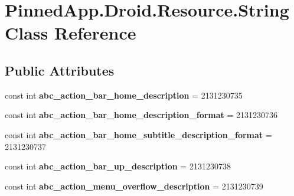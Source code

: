 \hypertarget{class_pinned_app_1_1_droid_1_1_resource_1_1_string}{}\section{Pinned\+App.\+Droid.\+Resource.\+String Class Reference}
\label{class_pinned_app_1_1_droid_1_1_resource_1_1_string}
\subsection*{Public Attributes}
\begin{DoxyCompactItemize}
\item 
\mbox{\label{class_pinned_app_1_1_droid_1_1_resource_1_1_string_a4550908b86832884163cd17ec3d263b3}} 
const int {\bfseries abc\+\_\+action\+\_\+bar\+\_\+home\+\_\+description} = 2131230735
\item 
\mbox{\label{class_pinned_app_1_1_droid_1_1_resource_1_1_string_a8b2da1b16ad58e7f48e6b8450a4606d6}} 
const int {\bfseries abc\+\_\+action\+\_\+bar\+\_\+home\+\_\+description\+\_\+format} = 2131230736
\item 
\mbox{\label{class_pinned_app_1_1_droid_1_1_resource_1_1_string_a1b7baeddffea55e32a95a4de0c56eba9}} 
const int {\bfseries abc\+\_\+action\+\_\+bar\+\_\+home\+\_\+subtitle\+\_\+description\+\_\+format} = 2131230737
\item 
\mbox{\label{class_pinned_app_1_1_droid_1_1_resource_1_1_string_ad0dde481f7eac8b46d4f91fe8b340fa7}} 
const int {\bfseries abc\+\_\+action\+\_\+bar\+\_\+up\+\_\+description} = 2131230738
\item 
\mbox{\label{class_pinned_app_1_1_droid_1_1_resource_1_1_string_ab669ce3879ceadd0412357ed74aeb02c}} 
const int {\bfseries abc\+\_\+action\+\_\+menu\+\_\+overflow\+\_\+description} = 2131230739
\item 
\mbox{\label{class_pinned_app_1_1_droid_1_1_resource_1_1_string_a486fa1afefd06c9582a63f3dc266affd}} 

\end{DoxyCompactItemize}
